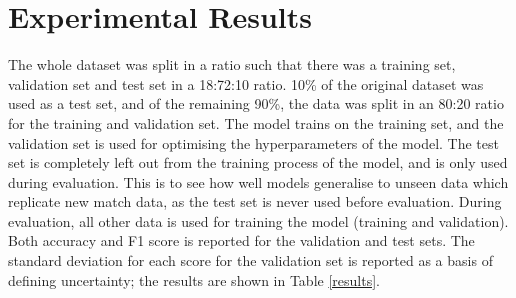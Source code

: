\section{Experimental Results} \label{experresults}
The whole dataset was split in a ratio such that there was a training set, validation set and test set in a 18:72:10 ratio. 10\% of the original dataset was used as a test set, and of the remaining 90\%, the data was split in an 80:20 ratio for the training and validation set.
The model trains on the training set, and the validation set is used for optimising the hyperparameters of the model.
The test set is completely left out from the training process of the model, and is only used during evaluation. This is to see how well models generalise to unseen data which replicate new match data, as the test set is never used before evaluation. During evaluation, all other data is used for training the model (training and validation).
Both accuracy and F1 score is reported for the validation and test sets. The standard deviation for each score for the validation set is reported as a basis of defining uncertainty; the results are shown in Table \ref{results}.

\begin{table}[H]
\caption{Model performance comparing validation and test sets}
\label{results}
\centering
\setlength{\tabcolsep}{3pt}
\end{table}

